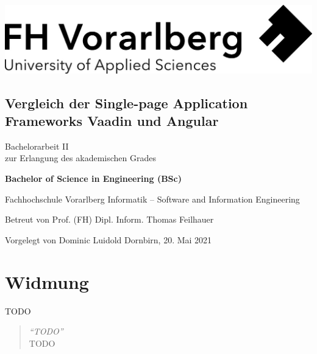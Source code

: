\documentclass[a4paper,12pt,twoside]{scrreprt}
\begin{document}
\onehalfspacing %

{}
\cleardoublepage %
\thispagestyle{empty}
\begin{titlepage}
    \begin{flushright}
    \includegraphics[width=0.4\linewidth]{images/FHV_FHV-Logo.jpg}
    \end{flushright}
    \begin{flushleft}
    \section*{Vergleich der Single-page Application Frameworks Vaadin und Angular}
    \vspace{1cm}

    Bachelorarbeit II\\
    zur Erlangung des akademischen Grades
    \vspace{0.5cm}

    \textbf{Bachelor of Science in Engineering (BSc)}

    \vspace{1cm}
    Fachhochschule Vorarlberg\newline
    Informatik – Software and Information Engineering

    \vspace{0.5cm}

    Betreut von\newline
    Prof. (FH) Dipl. Inform. Thomas Feilhauer

    \vspace{0.5cm}

    Vorgelegt von\newline
    Dominic Luidold\newline
    Dornbirn, 20. Mai 2021
    \end{flushleft}
\end{titlepage}

\newpage
\section*{Widmung}
\label{sec:widmung}
TODO

\bigskip

\begin{quote}
    \begin{flushright}
        \textit{\enquote{TODO}}\\
        TODO
    \end{flushright}
\end{quote}
\end{document}
